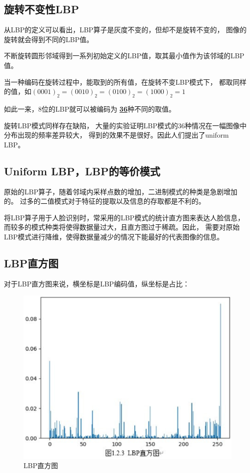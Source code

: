 \documentclass[AutoFakeBold]{MyFormat}
\begin{document}
\subsection{旋转不变性LBP}
\par 从LBP的定义可以看出，LBP算子是灰度不变的，但却不是旋转不变的，
图像的旋转就会得到不同的LBP值。
\par 不断旋转圆形邻域得到一系列初始定义的LBP值，取其最小值作为该邻域的LBP值。
\par 当一种编码在旋转过程中，能取到的所有值，在旋转不变LBP模式下，
都取同样的值，如$(0001)_2 = (0010)_2 = (0100)_2 = (1000)_2 = 1$
\par 如此一来，8位的LBP就可以被编码为
\textbf{\Large \underline{36}}种不同的取值。
\par 旋转LBP模式同样存在缺陷，
大量的实验证明LBP模式的36种情况在一幅图像中分布出现的频率差异较大，
得到的效果不是很好。因此人们提出了uniform LBP。

\subsection{Uniform LBP，LBP的等价模式}
\par 原始的LBP算子，随着邻域内采样点数的增加，二进制模式的种类是急剧增加的。
过多的二值模式对于特征的提取以及信息的存取都是不利的。
\par 将LBP算子用于人脸识别时，常采用的LBP模式的统计直方图来表达人脸信息，
而较多的模式种类将使得数据量过大，且直方图过于稀疏。因此，
需要对原始LBP模式进行降维，使得数据量减少的情况下能最好的代表图像的信息。

\subsection{LBP直方图}
\par 对于LBP直方图来说，横坐标是LBP编码值，纵坐标是占比：

\begin{figure}[!h]
    \centering
    \includegraphics[width=0.4\linewidth]{figures/2022.05.24/pic10.png}
    \caption{LBP直方图}
\end{figure}
\end{document}
